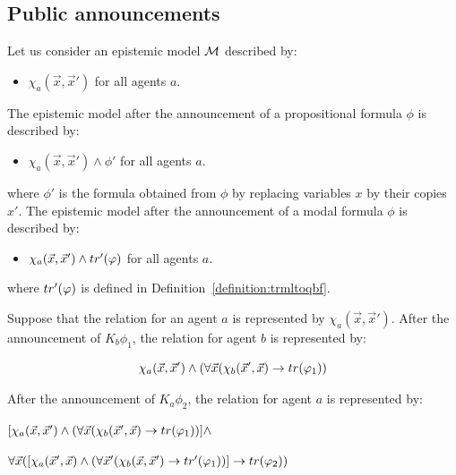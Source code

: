 \documentclass{article}
\begin{document}
\subsection{Public announcements}



Let us consider an epistemic model $\mathcal M$ described by:
\begin{itemize}
	\item $\chi_a(\vec x, \vec x')$ for all agents $a$.
\end{itemize}


The epistemic model after the announcement of a propositional formula $\phi$ is described by:
\begin{itemize}
	\item $\chi_a(\vec x, \vec x')\land \phi'$ for all agents $a$.
\end{itemize}

where $\phi'$ is the formula obtained from $\phi$ by replacing variables $x$ by their copies $x'$.
The epistemic model after the announcement of a modal formula $\phi$ is described by:
\begin{itemize}
	\item $\chi_a(\vec x, \vec x') \land tr'(\varphi)$ for all agents $a$.
\end{itemize}

where $tr'(\varphi)$ is defined in Definition~\ref{definition:trmltoqbf}.



\begin{example}
Suppose that the relation for an agent $a$ is represented by $\chi_a(\vec x, \vec x')$. After the announcement of $K_b \phi_1$, the relation for agent $b$ is represented by:


$$\chi_a(\vec x, \vec x') \land (\forall \vec x (\chi_b(\vec x', \vec x) \rightarrow tr(\varphi_1))$$

After the announcement of $K_a \phi_2$, the relation for agent $a$ is represented by:

\begin{center}
$[\chi_a(\vec x, \vec x') \land (\forall \vec x (\chi_b(\vec x', \vec x) \rightarrow tr(\varphi_1))] \land $

$\forall \vec x ([\chi_a(\vec x', \vec x) \land (\forall \vec x' (\chi_b(\vec x, \vec x') \rightarrow tr'(\varphi_1))] \rightarrow tr(\varphi_2))$
	
\end{center}


\end{example}
\end{document}
